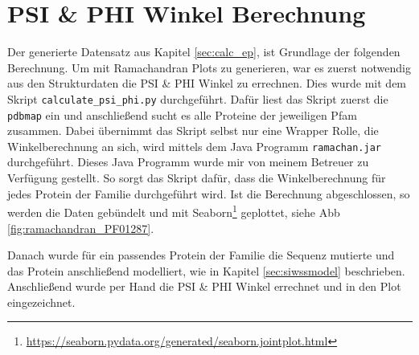 \newpage
\section{PSI \& PHI Winkel Berechnung}

Der generierte Datensatz aus Kapitel \ref{sec:calc_ep}, ist Grundlage der folgenden Berechnung. Um mit Ramachandran Plots zu generieren, war es zuerst notwendig aus den Strukturdaten die PSI \& PHI Winkel zu errechnen. Dies wurde mit dem Skript \texttt{calculate\_psi\_phi.py} durchgeführt. Dafür liest das Skript zuerst die \texttt{pdbmap} ein und anschließend sucht es alle Proteine der jeweiligen Pfam zusammen. Dabei übernimmt das Skript selbst nur eine Wrapper Rolle, die Winkelberechnung an sich, wird mittels dem Java Programm \texttt{ramachan.jar} durchgeführt. Dieses Java Programm wurde mir von meinem Betreuer zu Verfügung gestellt. So sorgt das Skript dafür, dass die Winkelberechnung für jedes Protein der Familie durchgeführt wird. Ist die Berechnung abgeschlossen, so werden die Daten gebündelt und mit Seaborn\footnote{\url{https://seaborn.pydata.org/generated/seaborn.jointplot.html}} geplottet, siehe \ac{Abb} \ref{fig:ramachandran_PF01287}. 

Danach wurde für ein passendes Protein der Familie die Sequenz mutierte und das Protein anschließend modelliert, wie in Kapitel \ref{sec:siwssmodel} beschrieben. Anschließend wurde per Hand die PSI \& PHI Winkel errechnet und in den Plot eingezeichnet.






